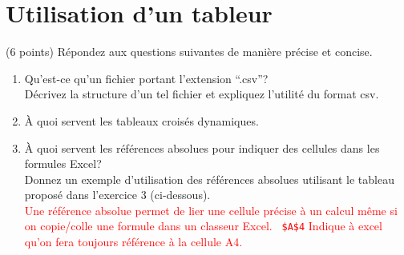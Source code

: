 \documentclass[a4paper]{article}
\newif\ifcorrection
\begin{document}
\section{Utilisation d'un tableur}
\vspace{-0.3cm}

\exost (6 points) R\'epondez aux questions suivantes de mani\`ere pr\'ecise et concise.
\begin{enumerate}
 \item Qu'est-ce qu'un fichier portant l'extension ``.csv''?\\D\'ecrivez la structure d'un tel fichier et expliquez l'utilit\'e du format csv. %
 \ifcorrection
 \textcolor{red}{~\\Un fichier csv est un fichier texte dont les champs sont s\'epar\'ees par des virgules.\\
 C'est un format universel qui permet d'\'echanger des donn\'ees entre plusieurs logiciels et lisible par un humain.}
 \fi
 \item \`A quoi servent les tableaux crois\'es dynamiques.%
  \ifcorrection
 \textcolor{red}{Un tableau crois\'e dynamique permet de faire une synth\`ese d'une table de donn\'ees en regroupant certaines lignes partageant des caract\'eristiques identiques.}
 \fi %
 \item \`A quoi servent les r\'ef\'erences absolues pour indiquer des cellules dans les formules Excel?\\ Donnez un exemple d'utilisation des r\'ef\'erences absolues utilisant le tableau propos\'e dans l'exercice 3 (ci-dessous).%
  \ifcorrection
 \textcolor{red}{~\\Une r\'ef\'erence absolue permet de lier une cellule pr\'ecise \`a un calcul m\^eme si on copie/colle une formule dans un classeur Excel. \verb? $A$4? Indique \`a excel qu'on fera toujours r\'ef\'erence \`a la cellule A4. }

\end{enumerate}
\end{document}
